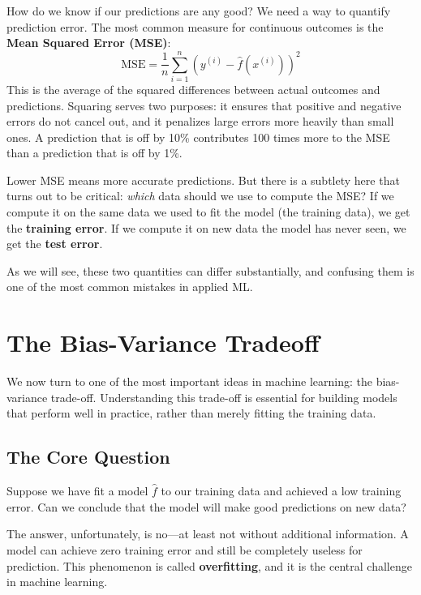 \documentclass[11pt,a4paper]{article}
\newcommand{\keyword}[1]{\textbf{\textcolor{AccentOrange}{#1}}}
\begin{document}
How do we know if our predictions are any good? We need a way to quantify prediction error. The most common measure for continuous outcomes is the \keyword{Mean Squared Error (MSE)}:
\[
\text{MSE} = \frac{1}{n}\sum_{i=1}^{n}(y^{(i)} - \widehat{f}(x^{(i)}))^2
\]
This is the average of the squared differences between actual outcomes and predictions. Squaring serves two purposes: it ensures that positive and negative errors do not cancel out, and it penalizes large errors more heavily than small ones. A prediction that is off by 10\% contributes 100 times more to the MSE than a prediction that is off by 1\%.

Lower MSE means more accurate predictions. But there is a subtlety here that turns out to be critical: \emph{which} data should we use to compute the MSE? If we compute it on the same data we used to fit the model (the training data), we get the \keyword{training error}. If we compute it on new data the model has never seen, we get the \keyword{test error}.

As we will see, these two quantities can differ substantially, and confusing them is one of the most common mistakes in applied ML.

\section{The Bias-Variance Tradeoff}

We now turn to one of the most important ideas in machine learning: the bias-variance trade-off. Understanding this trade-off is essential for building models that perform well in practice, rather than merely fitting the training data.

\subsection{The Core Question}

Suppose we have fit a model $\widehat{f}$ to our training data and achieved a low training error. Can we conclude that the model will make good predictions on new data? 

The answer, unfortunately, is no---at least not without additional information. A model can achieve zero training error and still be completely useless for prediction. This phenomenon is called \keyword{overfitting}, and it is the central challenge in machine learning.
\end{document}
